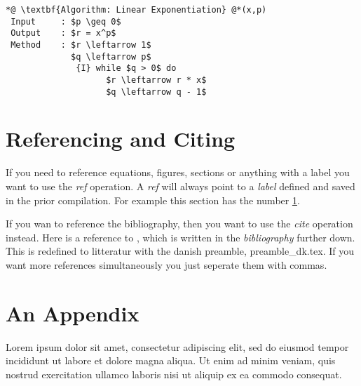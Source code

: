 \documentclass[a4, english]{article}
\begin{document}
\begin{lstlisting}[firstnumber=1,
                   caption={The algorithm \emph{linear exponentiation}},
                   label={lst:algorithm}]
*@ \textbf{Algorithm: Linear Exponentiation} @*(x,p)
 Input     : $p \geq 0$
 Output    : $r = x^p$
 Method    : $r \leftarrow 1$
             $q \leftarrow p$
              {I} while $q > 0$ do
                    $r \leftarrow r * x$
                    $q \leftarrow q - 1$
\end{lstlisting}

\section{Referencing and Citing} \label{sec:ref}
If you need to reference equations, figures, sections or anything with a label
you want to use the \emph{ref} operation. A \emph{ref} will always point to a
\emph{label} defined and saved in the prior compilation. For example this
section has the number \ref{sec:ref}.

If you wan to reference the bibliography, then you want to use the \emph{cite}
operation instead. Here is a reference to \cite{hansen2020}, which is written in
the \emph{bibliography} further down. This is redefined to litteratur with the
danish preamble, preamble\_dk.tex. If you want more references simultaneously
you just seperate them with commas.

\printbibliography

\newpage \appendix
\section{An Appendix}
Lorem ipsum dolor sit amet, consectetur adipiscing elit, sed do eiusmod tempor
incididunt ut labore et dolore magna aliqua. Ut enim ad minim veniam, quis
nostrud exercitation ullamco laboris nisi ut aliquip ex ea commodo consequat.
\end{document}
